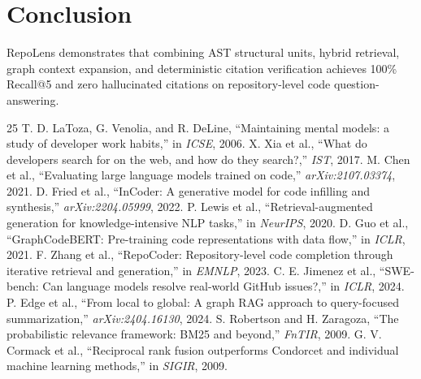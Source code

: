 \documentclass[sigconf,screen]{acmart}
\begin{document}
\section{Conclusion}
RepoLens demonstrates that combining AST structural units, hybrid retrieval, graph context expansion, and deterministic citation verification achieves 100\% Recall@5 and zero hallucinated citations on repository-level code question-answering.

\begin{thebibliography}{25}
 T. D. LaToza, G. Venolia, and R. DeLine, ``Maintaining mental models: a study of developer work habits,'' in \textit{ICSE}, 2006.
 X. Xia et al., ``What do developers search for on the web, and how do they search?,'' \textit{IST}, 2017.
 M. Chen et al., ``Evaluating large language models trained on code,'' \textit{arXiv:2107.03374}, 2021.
 D. Fried et al., ``InCoder: A generative model for code infilling and synthesis,'' \textit{arXiv:2204.05999}, 2022.
 P. Lewis et al., ``Retrieval-augmented generation for knowledge-intensive NLP tasks,'' in \textit{NeurIPS}, 2020.
 D. Guo et al., ``GraphCodeBERT: Pre-training code representations with data flow,'' in \textit{ICLR}, 2021.
 F. Zhang et al., ``RepoCoder: Repository-level code completion through iterative retrieval and generation,'' in \textit{EMNLP}, 2023.
 C. E. Jimenez et al., ``SWE-bench: Can language models resolve real-world GitHub issues?,'' in \textit{ICLR}, 2024.
 P. Edge et al., ``From local to global: A graph RAG approach to query-focused summarization,'' \textit{arXiv:2404.16130}, 2024.
 S. Robertson and H. Zaragoza, ``The probabilistic relevance framework: BM25 and beyond,'' \textit{FnTIR}, 2009.
 G. V. Cormack et al., ``Reciprocal rank fusion outperforms Condorcet and individual machine learning methods,'' in \textit{SIGIR}, 2009.
\end{thebibliography}
\end{document}
